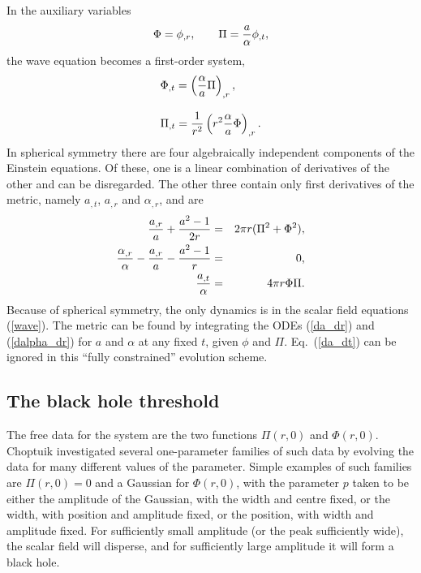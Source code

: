 \documentclass{article}
\begin{document}
In the auxiliary variables
%
\begin{equation}
  \Phi = \phi_{, r}, \qquad \Pi={a\over\alpha} \phi_{, t},
\end{equation}
%
the wave equation becomes a first-order system,
%
\begin{equation}
  \label{wave}
  \begin{array}{l}
    \displaystyle \Phi_{, t} = \left({\alpha\over a}\Pi\right)_{, r},
    \\ \\
    \displaystyle \Pi_{, t} = {1\over r^2} \left(r^2{\alpha\over a}
    \Phi\right)_{, r}.
  \end{array}
\end{equation}
%
In spherical symmetry there are four algebraically independent
components of the Einstein equations. Of these, one is a linear
combination of derivatives of the other and can be disregarded. The
other three contain only first derivatives of the metric, namely
$a_{, t}$, $a_{, r}$ and $\alpha_{, r}$, and are
%
\begin{eqnarray}
  \label{da_dr}
  {a_{, r}\over a}  + {a^2 -1 \over 2r} 
  &=& 2\pi r (\Pi^2 + \Phi^2), \\
  \label{dalpha_dr}
  {\alpha_{, r}\over \alpha}  - {a_{, r}\over a}  - {a^2 -1 \over r}
  &=& 0, \\
  \label{da_dt}
  {a_{, t}\over \alpha}  &=& 4\pi r \Phi \Pi.
\end{eqnarray}
Because of spherical symmetry, the only dynamics is in the scalar
field equations (\ref{wave}). The metric can be found by integrating
the ODEs (\ref{da_dr}) and (\ref{dalpha_dr}) for $a$ and $\alpha$ at
any fixed $t$, given $\phi$ and $\Pi$. Eq.~(\ref{da_dt}) can be
ignored in this ``fully constrained'' evolution scheme.


\subsection{The black hole threshold}
\label{section:threshold}

The free data for the system are the two functions $\Pi(r,0)$ and
$\Phi(r,0)$. Choptuik investigated several one-parameter families of
such data by evolving the data for many different values of the
parameter. Simple examples of such families are $\Pi(r,0)=0$ and a
Gaussian for $\Phi(r,0)$,
with the parameter $p$ taken to be either the
amplitude of the Gaussian, with the width and centre fixed, or the
width, with position and amplitude fixed, or the position, with width
and amplitude fixed. For sufficiently small amplitude (or the peak
sufficiently wide), the scalar field will disperse, and for
sufficiently large amplitude it will form a black hole. 
\end{document}
